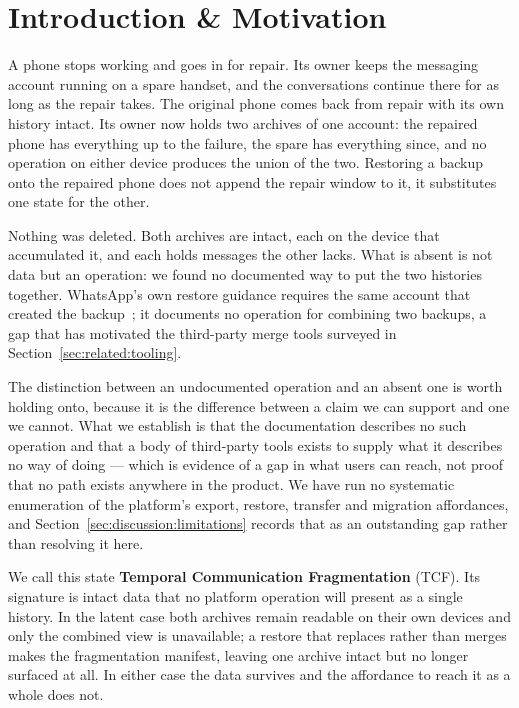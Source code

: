 
\section{Introduction \& Motivation}
\label{sec:introduction}

A phone stops working and goes in for repair. Its owner keeps the messaging
account running on a spare handset, and the conversations continue there for
as long as the repair takes. The original phone comes back from repair with
its own history intact. Its owner now holds two archives of one account: the
repaired phone has everything up to the failure, the spare has everything
since, and no operation on either device produces the union of the two.
Restoring a backup onto the repaired phone does not append the repair window
to it, it substitutes one state for the other.

Nothing was deleted. Both archives are intact, each on the device that
accumulated it, and each holds messages the other lacks. What is absent is not
data but an operation: we found no documented way to put the two histories
together. WhatsApp's own restore guidance requires the same account that created
the backup~\citep{whatsapp_backup_restore}; it documents no operation for
combining two backups, a gap that has motivated the third-party merge tools
surveyed in Section~\ref{sec:related:tooling}.

The distinction between an undocumented operation and an absent one is worth
holding onto, because it is the difference between a claim we can support and one
we cannot. What we establish is that the documentation describes no such
operation and that a body of third-party tools exists to supply what it describes
no way of doing --- which is evidence of a gap in what users can reach, not proof
that no path exists anywhere in the product. We have run no systematic enumeration
of the platform's export, restore, transfer and migration affordances, and
Section~\ref{sec:discussion:limitations} records that as an outstanding gap rather
than resolving it here.

We call this state \textbf{Temporal Communication Fragmentation} (TCF). Its
signature is intact data that no platform operation will present as a single
history. In the latent case both archives remain readable on their own devices
and only the combined view is unavailable; a restore that replaces rather than
merges makes the fragmentation manifest, leaving one archive intact but no
longer surfaced at all. In either case the data survives and the affordance to
reach it as a whole does not.

